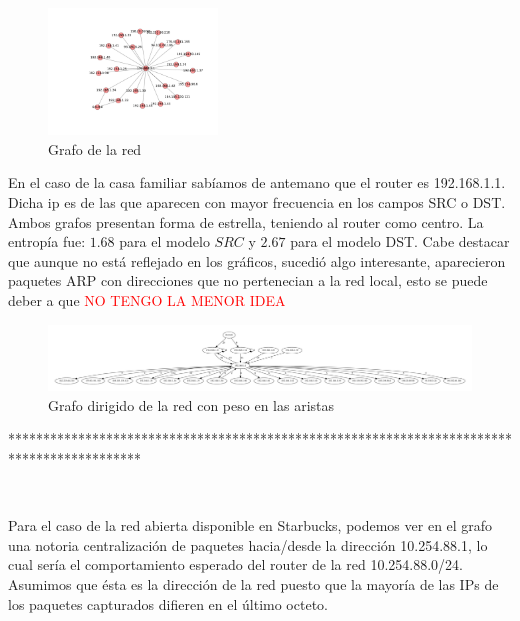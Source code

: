 \begin{figure}
\vspace{-35pt}
\hspace{-35pt}
\centering
   \includegraphics[width=0.4\textwidth]{resultados/casa/conectividadNX.pdf}
\vspace{-30pt}
   \caption{Grafo de la red}
\end{figure}

En el caso de la casa familiar sabíamos de antemano que el router es 192.168.1.1. Dicha ip es de las
que aparecen con mayor frecuencia en los campos SRC o DST. Ambos grafos presentan forma de estrella,
teniendo al router como centro. La entrop\'ia fue: $1.68$ para el modelo $SRC$ y $2.67$ para el modelo
DST. Cabe destacar que aunque no est\'a reflejado en los gr\'aficos, sucedi\'o algo interesante, 
aparecieron paquetes ARP con direcciones que no pertenecian a la red local, esto se puede deber a que
 \textcolor{red}{NO TENGO LA MENOR IDEA}



\begin{figure}[H]
   \includegraphics[width=1.0\textwidth]{resultados/casa/conectividad.pdf}
   \caption{Grafo dirigido de la red con peso en las aristas}
\end{figure}




*******************************************************************************************


~


Para el caso de la red abierta disponible en Starbucks, podemos ver en el 
grafo una notoria centralización de paquetes hacia/desde la dirección
10.254.88.1, lo cual sería el comportamiento esperado del router de la red
10.254.88.0/24. Asumimos que ésta es la dirección de la red puesto que 
la mayoría de las IPs de los paquetes capturados difieren en el último octeto.


